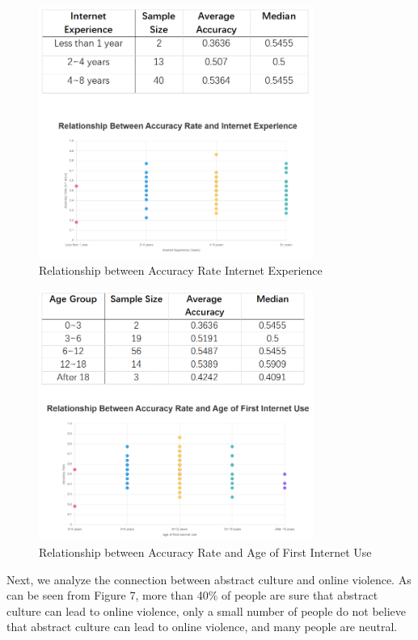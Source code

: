 \documentclass[12pt,a4paper]{ctexart}
\theoremstyle{MyLineTheoremStyle}
\theoremstyle{MyBlockTheoremStyle}
\theoremstyle{MySubsubsectionStyle}
\begin{document}
\begin{figure}[htbp]
    \centering
    \includegraphics[width=0.8\textwidth]{img/accuracy_vs_net_age.png}
    \caption{Relationship between Accuracy Rate Internet Experience}
    \label{fig:accuracy_vs_net_age}
\end{figure}
\newpage

\begin{figure}[htbp]
    \centering
    \includegraphics[width=0.8\textwidth]{img/accuracy_vs_first_use_age.png}
    \caption{Relationship between Accuracy Rate and Age of First Internet Use}
    \label{fig:accuracy_vs_first_use_age}
\end{figure}
\newpage

Next, we analyze the connection between abstract culture and online violence. As can be seen from Figure 7, more than 40\% of people are sure that abstract culture can lead to online violence, only a small number of people do not believe that abstract culture can lead to online violence, and many people are neutral.
\end{document}
